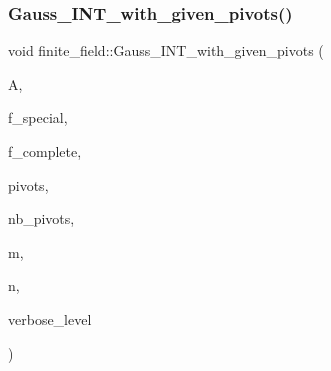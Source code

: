 \subsubsection{\texorpdfstring{Gauss\+\_\+\+I\+N\+T\+\_\+with\+\_\+given\+\_\+pivots()}{Gauss\_INT\_with\_given\_pivots()}}
{\footnotesize\ttfamily void finite\+\_\+field\+::\+Gauss\+\_\+\+I\+N\+T\+\_\+with\+\_\+given\+\_\+pivots (\begin{DoxyParamCaption}\item[{\mbox{\hyperlink{galois_8h_a09fddde158a3a20bd2dcadb609de11dc}{I\+NT}} $\ast$}]{A,  }\item[{\mbox{\hyperlink{galois_8h_a09fddde158a3a20bd2dcadb609de11dc}{I\+NT}}}]{f\+\_\+special,  }\item[{\mbox{\hyperlink{galois_8h_a09fddde158a3a20bd2dcadb609de11dc}{I\+NT}}}]{f\+\_\+complete,  }\item[{\mbox{\hyperlink{galois_8h_a09fddde158a3a20bd2dcadb609de11dc}{I\+NT}} $\ast$}]{pivots,  }\item[{\mbox{\hyperlink{galois_8h_a09fddde158a3a20bd2dcadb609de11dc}{I\+NT}}}]{nb\+\_\+pivots,  }\item[{\mbox{\hyperlink{galois_8h_a09fddde158a3a20bd2dcadb609de11dc}{I\+NT}}}]{m,  }\item[{\mbox{\hyperlink{galois_8h_a09fddde158a3a20bd2dcadb609de11dc}{I\+NT}}}]{n,  }\item[{\mbox{\hyperlink{galois_8h_a09fddde158a3a20bd2dcadb609de11dc}{I\+NT}}}]{verbose\+\_\+level }\end{DoxyParamCaption})}

\mbox{\label{classfinite__field_a8b9b9013908db7bb654b79c8ea273904}} 
